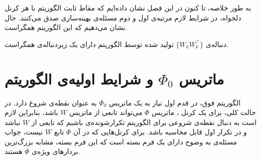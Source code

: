 به طور خلاصه، تا کنون  در این فصل نشان داده‌ایم که مقاط ثابت الگوریتم
با هر کرنل
دلخواه، در شرایط لازم مرتبه‌ی اول و دوم مسئله‌ی بهینه‌سازی
صدق می‌کنند. حال نشان می‌دهیم که این الگوریتم همگراست.
\begin{thm}
 دنباله‌ی
$\{W_kW_k^\top\}$
تولید شده توسط الگوریتم 
دارای یک زیردنباله‌ی همگراست.
\end{thm}


\section{
ماتریس
$\Phi_0$
و شرایط اولیه‌ی الگوریتم
}
الگوریتم فوق، در قدم اول نیاز به یک ماتریس 
$\Phi_0$
به عنوان نقطه‌ی شروع دارد. در حالت کلی، برای یک کرنل 
،
ماتریس 
$\Phi$
می‌تواند تابعی از ماتریس 
$W$
باشد، بنابراین لازم است به دنبال‌ نقطه‌ی شروعی برای الگوریتم تکرارشونده‌ی 
 باشیم که تابعی از 
$W$
نباشد و در تکرار اول قابل محاسبه باشد. برای کرنل‌هایی که در آن
$\Phi$
تابع 
$W$
نیست، جواب مسئله‌ی 
به وضوح دارای یک فرم بسته است که این فرم بسته، مشابه 
 بزرگ‌ترین بردارهای ویژه‌ی 
$\Phi$
هستند. 


